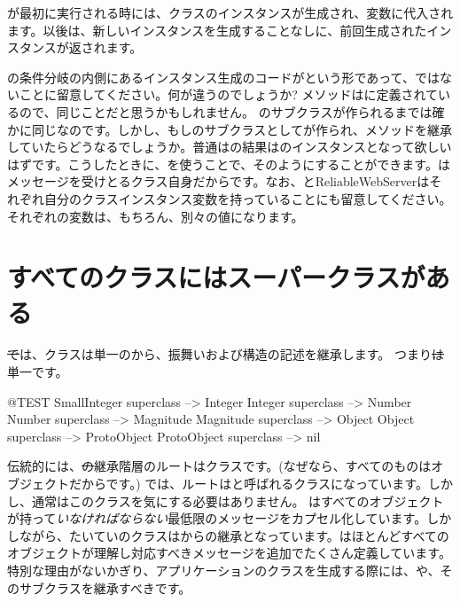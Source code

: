 \documentclass[a4paper,10pt,twoside]{book}
\begin{document}
が最初に実行される時には、クラスのインスタンスが生成され、変数に代入されます。以後は、新しいインスタンスを生成することなしに、前回生成されたインスタンスが返されます。

の条件分岐の内側にあるインスタンス生成のコードがという形であって、ではないことに留意してください。何が違うのでしょうか?
メソッドはに定義されているので、同じことだと思うかもしれません。
のサブクラスが作られるまでは確かに同じなのです。しかし、もしのサブクラスとしてが作られ、メソッドを継承していたらどうなるでしょうか。普通はの結果はのインスタンスとなって欲しいはずです。こうしたときに、\self を使うことで、そのようにすることができます。\self はメッセージを受けとるクラス自身だからです。なお、と{ReliableWebServer}はそれぞれ自分のクラスインスタンス変数を持っていることにも留意してください。それぞれの変数は、もちろん、別々の値になります。

\section{すべてのクラスにはスーパークラスがある}


\st では、クラスは単一のから、振舞いおよび構造の記述を継承します。
つまり\st は単一です。

\begin{code}{@TEST}
SmallInteger superclass --> Integer
Integer superclass          --> Number
Number superclass        --> Magnitude
Magnitude superclass    --> Object
Object superclass           --> ProtoObject
ProtoObject superclass  --> nil
\end{code}

伝統的には、\st の継承階層のルートはクラスです。(なぜなら、すべてのものはオブジェクトだからです。)
\pharo では、ルートはと呼ばれるクラスになっています。しかし、通常はこのクラスを気にする必要はありません。 はすべてのオブジェクトが持って\emph{いなければならない}最低限のメッセージをカプセル化しています。しかしながら、たいていのクラスはからの継承となっています。はほとんどすべてのオブジェクトが理解し対応すべきメッセージを追加でたくさん定義しています。特別な理由がないかぎり、アプリケーションのクラスを生成する際には、や、そのサブクラスを継承すべきです。
\end{document}
